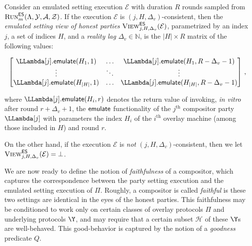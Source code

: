 \begin{definition}
  Consider an emulated setting execution $\mathcal{E}$ with duration $R$ rounds
  sampled from $\textsc{Run}^{\textsf{ES}}_m(\Lambda, \mathcal{Y}, \mathcal{A}, \mathcal{Z})$.
  If the execution $\mathcal{E}$ is $(j,H,\Delta_v)$-consistent, then
  the \emph{emulated setting view of honest parties} $\textsc{View}^{\textsf{ES}}_{j,H,\Delta_v}(\mathcal{E})$,
  parametrized by an index $j$, a set of indices $H$, and a \emph{reality lag} $\Delta_v \in \mathbb{N}$,
  is the $|H| \times R$ matrix of the following values:

  \[
  \begin{bmatrix}
    \LLambda[j].\emulateMachine(H_1, 1) & \ldots & \LLambda[j].\emulateMachine(H_1, R - \Delta_v - 1)\\
                                 \vdots & \ddots & \vdots \\
    \LLambda[j].\emulateMachine(H_{|H|}, 1) & \ldots & \LLambda[j].\emulateMachine(H_{|H|}, R - \Delta_v - 1)
  \end{bmatrix}\,,
  \]

  where $\LLambda[j].\emulateMachine(H_i, r)$ denotes the return value of invoking,
  \emph{in vitro} after round $r + \Delta_v + 1$,
  the $\textsf{emulate}$ functionality of the $j^\text{th}$ compositor party $\LLambda[j]$
  with parameters the index $H_i$ of the $i^\text{th}$ overlay machine (among those
  included in $H$) and round $r$.

  On the other hand, if the execution $\mathcal{E}$ is \emph{not} $(j,H,\Delta_v)$-consistent, then
  we let $\textsc{View}^{\textsf{ES}}_{j,H,\Delta_v}(\mathcal{E}) = \bot$.
\end{definition}

\begin{definition}[Lateness]
\end{definition}


We are now ready to define the notion of \emph{faithfulness} of a
compositor, which captures the
correspondence between the party setting execution and the emulated setting
execution of $\Pi$. Roughly, a compositor is called \emph{faithful} is these
two settings are identical in the eyes of the honest parties.
This faithfulness may be conditioned to work only on certain classes
of overlay protocols $\Pi$ and underlying protocols $\Y$, and may
require that a certain subset $\mathcal{H}$ of these $\Y$s are well-behaved.
This good-behavior is captured by the notion of a \emph{goodness} predicate $Q$.

